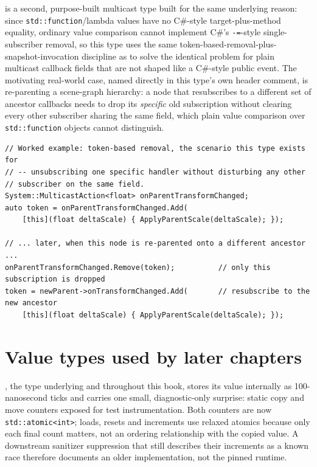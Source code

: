  is a second, purpose-built multicast type built
for the same underlying reason: since \texttt{std::function}/lambda values have no C\#-style
target-plus-method equality, ordinary value comparison cannot implement C\#'s
\texttt{-=}-style single-subscriber removal, so this type uses the same
token-based-removal-plus-snapshot-invocation discipline as  to solve
the identical problem for plain multicast callback fields that are not shaped like a
C\#-style public event. The motivating real-world case, named directly in this type's own
header comment, is re-parenting a scene-graph hierarchy: a node that resubscribes to a
different set of ancestor callbacks needs to drop its \emph{specific} old subscription without
clearing every other subscriber sharing the same field, which plain value comparison over
\texttt{std::function} objects cannot distinguish.

\begin{lstlisting}
// Worked example: token-based removal, the scenario this type exists for
// -- unsubscribing one specific handler without disturbing any other
// subscriber on the same field.
System::MulticastAction<float> onParentTransformChanged;
auto token = onParentTransformChanged.Add(
    [this](float deltaScale) { ApplyParentScale(deltaScale); });

// ... later, when this node is re-parented onto a different ancestor ...
onParentTransformChanged.Remove(token);          // only this subscription is dropped
token = newParent->onTransformChanged.Add(       // resubscribe to the new ancestor
    [this](float deltaScale) { ApplyParentScale(deltaScale); });
\end{lstlisting}

\section{Value types used by later chapters}

, the type underlying  and
 throughout this book, stores its value internally
as 100-nanosecond ticks and carries one small, diagnostic-only surprise: static copy and move
counters exposed for test instrumentation. Both counters are now \texttt{std::atomic<int>};
loads, resets and increments use relaxed atomics because only each final count matters, not an
ordering relationship with the copied value. A downstream sanitizer suppression that still
describes their increments as a known  race therefore documents an older
implementation, not the pinned runtime.

